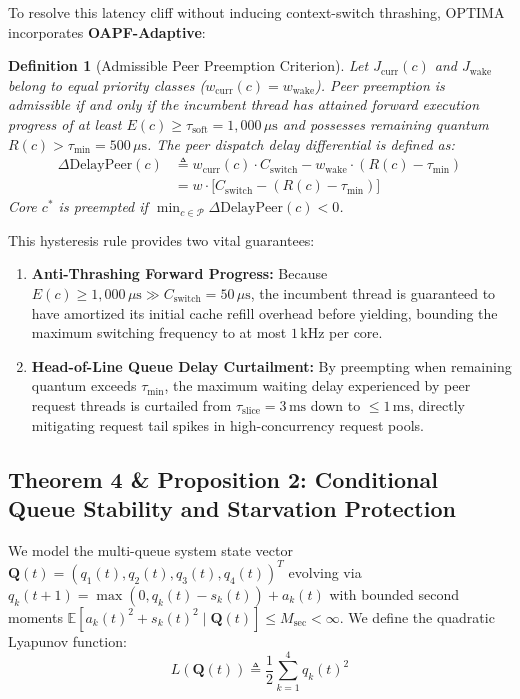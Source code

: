 \documentclass[letterpaper,twocolumn,10pt]{article}
\newtheorem{definition}{Definition}
\begin{document}
To resolve this latency cliff without inducing context-switch thrashing, OPTIMA incorporates \textbf{OAPF-Adaptive}:
\begin{definition}[Admissible Peer Preemption Criterion]
Let $J_{\mathrm{curr}}(c)$ and $J_{\mathrm{wake}}$ belong to equal priority classes ($w_{\mathrm{curr}}(c) = w_{\mathrm{wake}}$). Peer preemption is admissible if and only if the incumbent thread has attained forward execution progress of at least $E(c) \ge \tau_{\mathrm{soft}} = 1{,}000\,\mu\mathrm{s}$ and possesses remaining quantum $R(c) > \tau_{\min} = 500\,\mu\mathrm{s}$. The peer dispatch delay differential is defined as:
\begin{align}
\label{eq:peer_delay}
\Delta\mathrm{DelayPeer}(c) &\triangleq w_{\mathrm{curr}}(c) \cdot C_{\mathrm{switch}} - w_{\mathrm{wake}} \cdot (R(c) - \tau_{\min}) \nonumber \\
&= w \cdot \Big[ C_{\mathrm{switch}} - (R(c) - \tau_{\min}) \Big]
\end{align}
Core $c^*$ is preempted if $\min_{c \in \mathcal{P}} \Delta\mathrm{DelayPeer}(c) < 0$.
\end{definition}

This hysteresis rule provides two vital guarantees:
\begin{enumerate}
    \item \textbf{Anti-Thrashing Forward Progress:} Because $E(c) \ge 1{,}000\,\mu\mathrm{s} \gg C_{\mathrm{switch}} = 50\,\mu\mathrm{s}$, the incumbent thread is guaranteed to have amortized its initial cache refill overhead before yielding, bounding the maximum switching frequency to at most $1\,\mathrm{kHz}$ per core.
    \item \textbf{Head-of-Line Queue Delay Curtailment:} By preempting when remaining quantum exceeds $\tau_{\min}$, the maximum waiting delay experienced by peer request threads is curtailed from $\tau_{\mathrm{slice}} = 3\,\mathrm{ms}$ down to $\le 1\,\mathrm{ms}$, directly mitigating request tail spikes in high-concurrency request pools.
\end{enumerate}

\subsection{Theorem 4 \& Proposition 2: Conditional Queue Stability and Starvation Protection}
\label{sec:stability_theory}
We model the multi-queue system state vector $\mathbf{Q}(t) = (q_1(t), q_2(t), q_3(t), q_4(t))^T$ evolving via $q_k(t+1) = \max(0, q_k(t) - s_k(t)) + a_k(t)$ with bounded second moments $\mathbb{E}[a_k(t)^2 + s_k(t)^2 \mid \mathbf{Q}(t)] \le M_{\mathrm{sec}} < \infty$. We define the quadratic Lyapunov function:
\begin{equation}
L(\mathbf{Q}(t)) \triangleq \frac{1}{2} \sum_{k=1}^4 q_k(t)^2
\end{equation}
\end{document}
